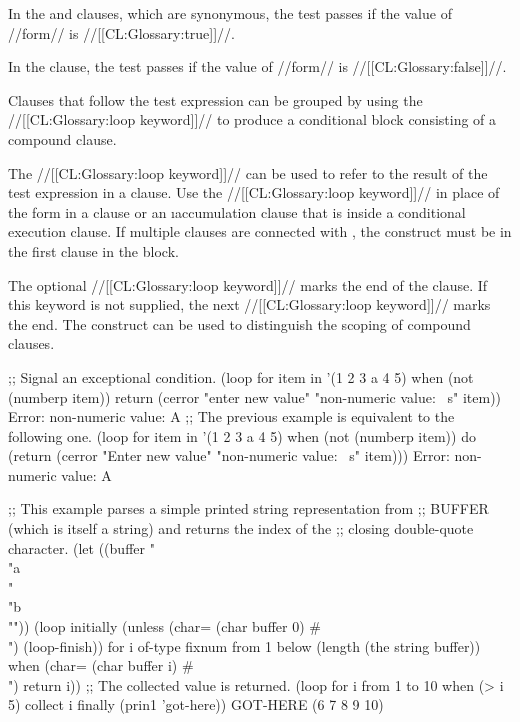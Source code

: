 In the  and  clauses, which are synonymous, the test passes if the value of //form// is //[[CL:Glossary:true]]//.

In the  clause, the test passes if the value of //form// is //[[CL:Glossary:false]]//.

  Clauses that follow the test expression can be grouped by using  the //[[CL:Glossary:loop keyword]]//  to produce a conditional block consisting of  a compound clause.

The //[[CL:Glossary:loop keyword]]//  can be used to refer to the result of the test expression in a clause. Use the //[[CL:Glossary:loop keyword]]//  in place of the form in a  clause or an \i{accumulation} clause that is inside a conditional execution clause. If multiple clauses are connected with , the  construct must be in the first clause in the block.

  The optional //[[CL:Glossary:loop keyword]]//  marks the end of the clause.  If this keyword is not supplied, the next //[[CL:Glossary:loop keyword]]// marks the end.  The construct  can be used to distinguish the scoping of compound clauses.

\code ;; Signal an exceptional condition.
 (loop for item in '(1 2 3 a 4 5)
       when (not (numberp item))
        return (cerror "enter new value" "non-numeric value: ~s" item)) Error: non-numeric value: A
  ;; The previous example is equivalent to the following one.
 (loop for item in '(1 2 3 a 4 5)
       when (not (numberp item))
        do (return 
            (cerror "Enter new value" "non-numeric value: ~s" item))) Error: non-numeric value: A \endcode

\code ;; This example parses a simple printed string representation from  ;; BUFFER (which is itself a string) and returns the index of the ;; closing double-quote character.
 (let ((buffer "\\"a\\" \\"b\\""))
   (loop initially (unless (char= (char buffer 0) #\\")
                     (loop-finish))
         for i of-type fixnum from 1 below (length (the string buffer))
         when (char= (char buffer i) #\\")
          return i)) 
  ;; The collected value is returned.
 (loop for i from 1 to 10
       when (> i 5)
         collect i
       finally (prin1 'got-here)) \OUT GOT-HERE \EV (6 7 8 9 10) 

